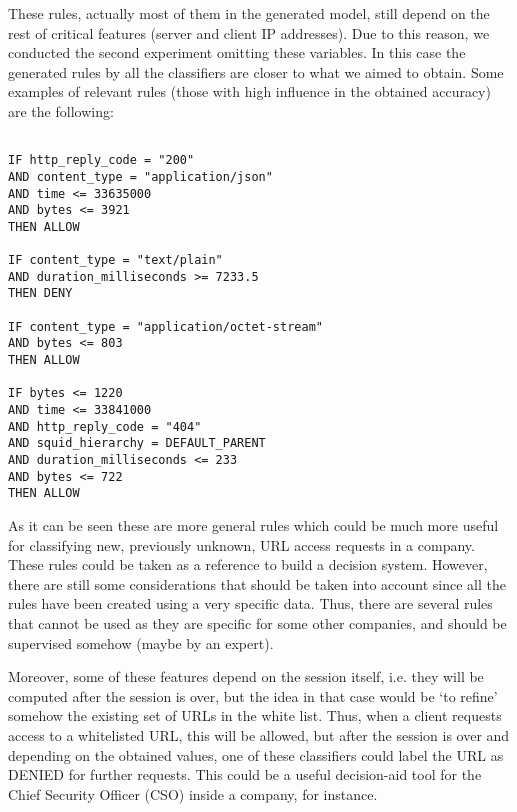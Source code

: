 \documentclass{llncs}
\begin{document}
These rules, actually most of them in the generated model, still depend on the rest of critical features (server and client IP addresses). Due to this reason, we conducted the second experiment omitting these variables. 
In this case the generated rules by all the classifiers are closer to what we aimed to obtain. Some examples of relevant rules (those with high influence in the obtained accuracy) are the following:

\begin{small}
\begin{verbatim}

IF http_reply_code = "200"
AND content_type = "application/json"
AND time <= 33635000
AND bytes <= 3921
THEN ALLOW

IF content_type = "text/plain"
AND duration_milliseconds >= 7233.5
THEN DENY

IF content_type = "application/octet-stream"
AND bytes <= 803
THEN ALLOW

IF bytes <= 1220
AND time <= 33841000
AND http_reply_code = "404"
AND squid_hierarchy = DEFAULT_PARENT
AND duration_milliseconds <= 233
AND bytes <= 722
THEN ALLOW
\end{verbatim}
\end{small}

As it can be seen these are more general rules which could be much more useful for classifying new, previously unknown, URL access requests in a company. These rules could be taken as a reference to build a decision system. However, there are still some considerations that should be taken into account since all the rules have been created using a very specific data. Thus, there are several rules that cannot be used as they are specific for some other companies, and should be supervised somehow (maybe by an expert).

Moreover, some of these features depend on the session itself, i.e. they will be computed after the session is over, but the idea in that case would be `to refine' somehow the existing set of URLs in the white list. Thus, when a client requests access to a whitelisted URL, this will be allowed, but after the session is over and depending on the obtained values, one of these classifiers could label the URL as DENIED for further requests. This could be a useful decision-aid tool for the Chief Security Officer (CSO) inside a company, for instance.

%
\end{document}
